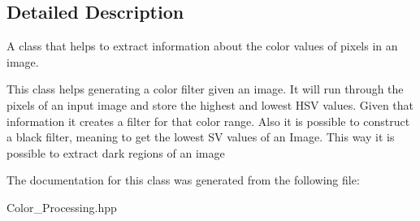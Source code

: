 \subsection{Detailed Description}
A class that helps to extract information about the color values of pixels in an image. 

This class helps generating a color filter given an image. It will run through the pixels of an input image and store the highest and lowest H\+SV values. Given that information it creates a filter for that color range. Also it is possible to construct a black filter, meaning to get the lowest SV values of an Image. This way it is possible to extract dark regions of an image 

The documentation for this class was generated from the following file\+:\begin{DoxyCompactItemize}
\item 
Color\+\_\+\+Processing.\+hpp\end{DoxyCompactItemize}

